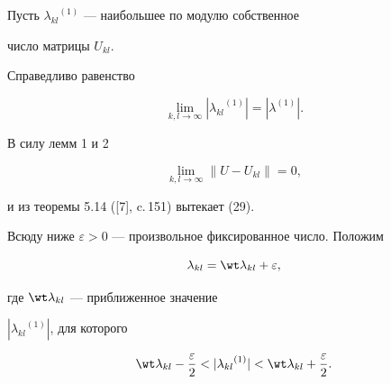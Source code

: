 Пусть ${\lambda_{kl}}^{(1)}$ --- наибольшее по модулю собственное


число матрицы $U_{kl}$.





\begin{lem}


Справедливо равенство


\begin{equation}


\lim_{k,l\to\infty}|{\lambda_{kl}}^{(1)}|=|\lambda^{(1)}|.


\end{equation}


\end{lem}





\begin{pf}


В силу лемм 1 и 2


\begin{equation}


\lim_{k,l\to\infty}\|U-U_{kl}\|=0,


\end{equation}


и из теоремы 5.14 ([7], c.\,151) вытекает (29).


\end{pf}





Всюду ниже ${\varepsilon}>0$ --- произвольное фиксированное число. Положим


\begin{equation}


\lambda_{kl}=\wt\lambda_{kl}+{\varepsilon},


\end{equation}


где $\wt\lambda_{kl}$ --- приближенное значение


$|{\lambda_{kl}}^{(1)}|$, для которого


\begin{equation}


\wt\lambda_{kl}-\frac{{\varepsilon}}{2}<


|{\lambda_{kl}}^{(1)}|<\wt\lambda_{kl}+\frac{{\varepsilon}}{2}.


\end{equation}





